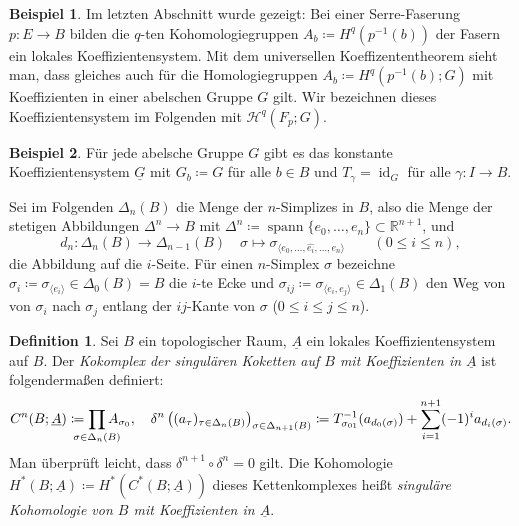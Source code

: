 \documentclass[11pt, a4paper, german]{article}
\theoremstyle{definition}
\newtheorem*{bsp}{Beispiel}
\newtheorem*{defn}{Definition}
\theoremstyle{remark}
\newcommand{\R}{\mathbb{R}} %
\DeclareMathOperator{\id}{id} %
\DeclareMathOperator{\spann}{spann} %
\newcommand{\angles}[1]{{\langle #1 \rangle}}
\newcommand{\LH}{\mathcal{H}} %
\begin{document}
\begin{bsp}
  Im letzten Abschnitt wurde gezeigt: Bei einer Serre-Faserung $p : E \to B$ bilden die $q$-ten Kohomologiegruppen $A_b \coloneqq H^q(p^{-1}(b))$ der Fasern ein lokales Koeffizientensystem.
  Mit dem universellen Koeffizententheorem sieht man, dass gleiches auch für die Homologiegruppen $A_b \coloneqq H^q(p^{-1}(b); G)$ mit Koeffizienten in einer abelschen Gruppe $G$ gilt.
  Wir bezeichnen dieses Koeffizientensystem im Folgenden mit $\LH^q(F_p; G)$. %
\end{bsp}

\begin{bsp}
  Für jede abelsche Gruppe $G$ gibt es das konstante Koeffizientensystem $\underline{G}$ mit $G_b \coloneqq G$ für alle $b \in B$ und $T_\gamma = \id_G$ für alle $\gamma : I \to B$.
\end{bsp}

Sei im Folgenden $\Delta_n(B)$ die Menge der $n$-Simplizes in $B$, also die Menge der stetigen Abbildungen $\Delta^n \to B$ mit $\Delta^n \coloneqq \spann \{ e_0, \ldots, e_n \} \subset \R^{n+1}$, und
\[
  d_n : \Delta_n(B) \to \Delta_{n-1}(B) \quad
  \sigma \mapsto \sigma_{\angles{e_0, \ldots, \hat{e_i}, \ldots, e_n}} \qquad (0 \leq i \leq n),
\]
die Abbildung auf die $i$-Seite. %
Für einen $n$-Simplex $\sigma$ bezeichne $\sigma_i \coloneqq \sigma_{\angles{e_i}} \in \Delta_0(B) = B$ die $i$-te Ecke und $\sigma_{ij} \coloneqq \sigma_{\angles{e_i, e_j}} \in \Delta_1(B)$ den Weg von von $\sigma_i$ nach $\sigma_j$ entlang der $ij$-Kante von $\sigma$ ($0 \leq i \leq j \leq n$).

\begin{defn}
  Sei $B$ ein topologischer Raum, $\underline{A}$ ein lokales Koeffizientensystem auf $B$.
  Der \emph{Kokomplex der singulären Koketten auf $B$ mit Koeffizienten in $\underline{A}$} ist folgendermaßen definiert:
  \[
    C^n(B; \underline{A}) \coloneqq \prod_{\mathclap{\sigma \in \Delta_n(B)}} A_{\sigma_0}, \quad
    \delta^n\left((a_\tau)_{\tau \in \Delta_n(B)}\right)_{\sigma \in \Delta_{n+1}(B)} \coloneqq T_{\sigma_{01}}^{-1}(a_{d_0(\sigma)}) + \sum_{i=1}^{n+1} (-1)^i a_{d_i(\sigma)}.
  \]
  Man überprüft leicht, dass $\delta^{n+1} \circ \delta^n = 0$ gilt.
  Die Kohomologie $H^*(B; \underline{A}) \coloneqq H^*(C^*(B; \underline{A}))$ dieses Kettenkomplexes heißt \emph{singuläre Kohomologie von $B$ mit Koeffizienten in $\underline{A}$}.
\end{defn}
\end{document}

